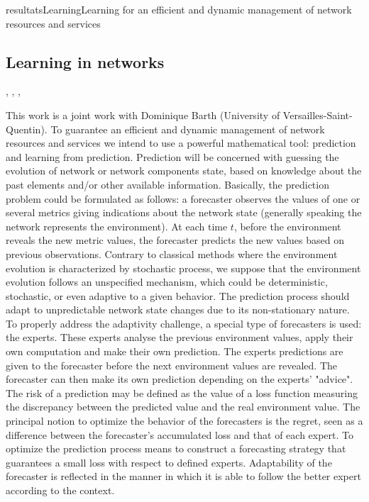 \documentclass{ra2016}
\begin{document}
\begin{module}{resultats}{Learning}{Learning for an efficient and dynamic management of network resources and services}

\subsection{Learning in networks}
\begin{participants}
,
,
,
\end{participants}

This work is a joint work with Dominique Barth (University of Versailles-Saint-Quentin). 
To guarantee an efficient and dynamic management of network resources and services we intend to use a powerful mathematical tool: prediction and learning from prediction. Prediction will be concerned with guessing the evolution of network or network components state, based on knowledge about the past elements and/or other available information.
Basically, the prediction problem could be formulated as follows: a forecaster observes the values of one or several metrics giving indications about the network state (generally speaking the network represents the environment). At each time $t$, before the environment reveals the new metric values, the forecaster predicts the new values based on previous observations. Contrary to classical methods where the environment evolution is characterized by stochastic process, we suppose that the environment evolution follows an unspecified mechanism, which could be deterministic, stochastic, or even adaptive to a given behavior. The prediction process should adapt to unpredictable network state changes due to its non-stationary nature. To properly address the adaptivity challenge, a special type of forecasters is used: the experts. These experts analyse the previous environment values, apply their own computation and make their own prediction.  The experts predictions are given to the forecaster before the next environment values are revealed. The forecaster can then make its own prediction depending on the experts' "advice".  The risk of a prediction may be defined as the value of a loss function measuring the discrepancy between the predicted value and the real environment value. The principal notion to optimize the behavior of the forecasters is the regret, seen as a difference between the forecaster's accumulated loss and that of each expert. To optimize the prediction process means to construct a forecasting strategy that guarantees a small loss with respect to defined experts. Adaptability of the forecaster is reflected in the manner in which it is able to follow the better expert according to the context.


\end{module}
\end{document}
